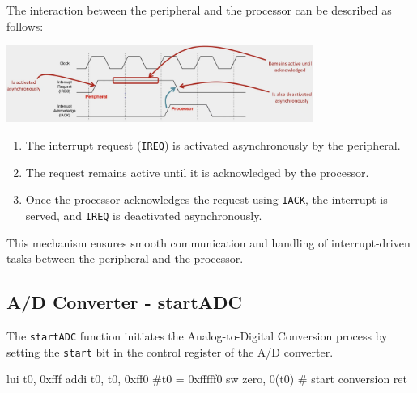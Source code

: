 The interaction between the peripheral and the processor can be described as follows:
\begin{center}
    \includegraphics[width=0.75\textwidth]{chapters/chapter2d/images/mecanism.png}
\end{center}
\begin{enumerate}
    \item The interrupt request (\texttt{IREQ}) is activated asynchronously by the peripheral.
    \item The request remains active until it is acknowledged by the processor.
    \item Once the processor acknowledges the request using \texttt{IACK}, the interrupt is served, and \texttt{IREQ} is deactivated asynchronously.
\end{enumerate}

This mechanism ensures smooth communication and handling of interrupt-driven tasks between the peripheral and the processor.

\subsection{A/D Converter - startADC}
The \texttt{startADC} function initiates the Analog-to-Digital Conversion process by setting the \texttt{start} bit in the control register of the A/D converter. \\
\begin{assembly}
    lui t0, 0xfff
    addi t0, t0, 0xff0 #t0 = 0xfffff0
    sw zero, 0(t0)     # start conversion
    ret
\end{assembly}
